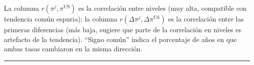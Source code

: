 \documentclass[12pt, letterpaper]{article}
\theoremstyle{remark}
\begin{document}
\noindent La columna $r(\pi^j, \pi^{\text{US}})$ es la correlaci\'on entre
niveles (muy alta, compatible con tendencia com\'un espuria); la columna
$r(\Delta\pi^j, \Delta\pi^{\text{US}})$ es la correlaci\'on entre las
primeras diferencias (m\'as baja, sugiere que parte de la correlaci\'on
en niveles es artefacto de la tendencia). ``Signo com\'un'' indica el
porcentaje de a\~nos en que ambas tasas cambiaron en la misma direcci\'on.

\vspace{14pt}
\noindent\rule{\linewidth}{0.4pt}

\end{document}
